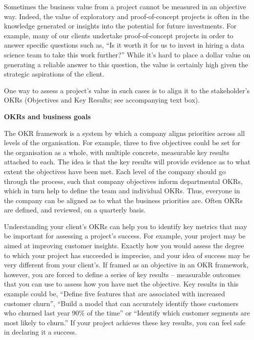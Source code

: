 \documentclass[
]{book}
\begin{document}
Sometimes the business value from a project cannot be measured in an
objective way. Indeed, the value of exploratory and proof-of-concept
projects is often in the knowledge generated or insights into the
potential for future investments. For example, many of our clients
undertake proof-of-concept projects in order to answer specific
questions such as, ``Is it worth it for us to invest in hiring a data
science team to take this work further?'' While it's hard to place a
dollar value on generating a reliable answer to this question, the value
is certainly high given the strategic aspirations of the client.

One way to assess a project's value in such cases is to align it to the
stakeholder's OKRs (Objectives and Key Results; see accompanying text
box).

\begin{infobox}

\textbf{OKRs and business goals}

The OKR framework is a system by which a company aligns priorities
across all levels of the organisation. For example, three to five
objectives could be set for the organisation as a whole, with multiple
concrete, measurable key results attached to each. The idea is that the
key results will provide evidence as to what extent the objectives have
been met. Each level of the company should go through the process, such
that company objectives inform departmental OKRs, which in turn help to
define the team and individual OKRs. Thus, everyone in the company can
be aligned as to what the business priorities are. Often OKRs are
defined, and reviewed, on a quarterly basis.

\end{infobox}

Understanding your client's OKRs can help you to identify key metrics
that may be important for assessing a project's success. For example,
your project may be aimed at improving customer insights. Exactly how
you would assess the degree to which your project has succeeded is
imprecise, and your idea of success may be very different from your
client's. If framed as an objective in an OKR framework, however, you
are forced to define a series of key results -- measurable outcomes that
you can use to assess how you have met the objective. Key results in
this example could be, ``Define five features that are associated with
increased customer churn'', ``Build a model that can accurately identify
those customers who churned last year 90\% of the time'' or ``Identify
which customer segments are most likely to churn.'' If your project
achieves these key results, you can feel safe in declaring it a success.
\end{document}
